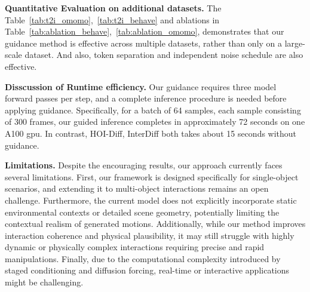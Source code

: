 \noindent\textbf{Quantitative Evaluation on additional datasets.} The Table~\ref{tab:t2i_omomo},~\ref{tab:t2i_behave} and  ablations in Table~\ref{tab:ablation_behave},~\ref{tab:ablation_omomo}, demonstrates that our guidance method is effective across multiple datasets, rather than only on a large-scale dataset. And also, token separation and independent noise schedule are also effective.







\noindent\textbf{Disscussion of Runtime efficiency.} Our guidance requires three model forward passes per step, and a complete inference procedure is needed before applying guidance. Specifically, for a batch of 64 samples, each sample consisting of 300 frames, our guided inference completes in approximately 72 seconds on one A100 gpu. In contrast, HOI-Diff, InterDiff both takes about 15 seconds without guidance.

\noindent\textbf{Limitations.} Despite the encouraging results, our approach currently faces several limitations. First, our framework is designed specifically for single-object scenarios, and extending it to multi-object interactions remains an open challenge. Furthermore, the current model does not explicitly incorporate static environmental contexts or detailed scene geometry, potentially limiting the contextual realism of generated motions. Additionally, while our method improves interaction coherence and physical plausibility, it may still struggle with highly dynamic or physically complex interactions requiring precise and rapid manipulations. Finally, due to the computational complexity introduced by staged conditioning and diffusion forcing, real-time or interactive applications might be challenging.
